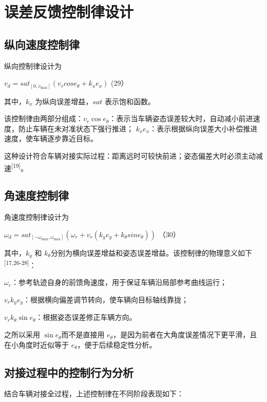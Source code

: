 \section{误差反馈控制律设计}

\subsection{纵向速度控制律}

纵向控制律设计为

\(v_{d} = {sat}_{\left\lbrack 0,v_{\max} \right\rbrack}\left( v_{r}cose_{\theta} + k_{x}e_{x} \right)\)
(29）

其中，\(k_{x}\) 为纵向误差增益，\(sat\) 表示饱和函数。

该控制律由两部分组成：\(v_{r}\cos e_{\theta}\)：表示当车辆姿态误差较大时，自动减小前进速度，防止车辆在未对准状态下强行推进；
\(k_{x}e_{x}\)：表示根据纵向误差大小补偿推进速度，使车辆逐步靠近目标。

这种设计符合车辆对接实际过程：距离远时可较快前进；姿态偏差大时必须主动减速\textsuperscript{[19]}。

\subsection{角速度控制律}

角速度控制律设计为

\(\omega_{d} = {sat}_{\left\lbrack - \omega_{\max},\omega_{\max} \right\rbrack}\left( \omega_{r} + v_{r}(k_{y}e_{y} + k_{\theta}sine_{\theta}) \right)\)
（30）

其中，\(k_{y}\) 和
\(k_{\theta}\)分别为横向误差增益和姿态误差增益。该控制律的物理意义如下\textsuperscript{[17,26-28]}：

\(\omega_{r}\)：参考轨迹自身的前馈角速度，用于保证车辆沿局部参考曲线运行；

\(v_{r}k_{y}e_{y}\)：根据横向偏差调节转向，使车辆向目标轴线靠拢；

\(v_{r}k_{\theta}\sin e_{\theta}\)：根据姿态误差修正车辆方向。

之所以采用 \(\sin e_{\theta}\)而不是直接用
\(e_{\theta}\)，是因为前者在大角度误差情况下更平滑，且在小角度时近似等于
\(e_{\theta}\)，便于后续稳定性分析。

\subsection{对接过程中的控制行为分析}

结合车辆对接全过程，上述控制律在不同阶段表现如下：

